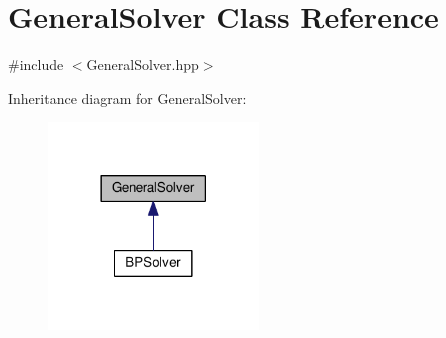 \hypertarget{class_general_solver}{\section{General\-Solver Class Reference}
\label{class_general_solver}
}


{\ttfamily \#include $<$General\-Solver.\-hpp$>$}



Inheritance diagram for General\-Solver\-:\nopagebreak
\begin{figure}[H]
\begin{center}
\leavevmode
\includegraphics[width=158pt]{class_general_solver__inherit__graph}
\end{center}
\end{figure}
